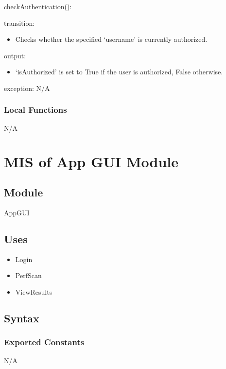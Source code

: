 \documentclass[12pt, titlepage]{article}
\begin{document}
\noindent checkAuthentication():
\begin{itemize}
  \begin{item}
    transition:
    \begin{itemize}
      \item Checks whether the specified `username' is currently authorized.
    \end{itemize}
  \end{item}
  \begin{item}
    output:
    \begin{itemize}
      \item `isAuthorized' is set to True if the user is authorized, False
        otherwise.
    \end{itemize}
  \end{item}
  \begin{item}
    exception: N/A
  \end{item}
\end{itemize}

\subsubsection{Local Functions}
N/A

\newpage

\section{MIS of App GUI Module} \label{mAppGUI}

\subsection{Module}
AppGUI

\subsection{Uses}

\begin{itemize}
  \item Login
  \item PerfScan
  \item ViewResults
\end{itemize}

\subsection{Syntax}

\subsubsection{Exported Constants}
N/A
\end{document}

